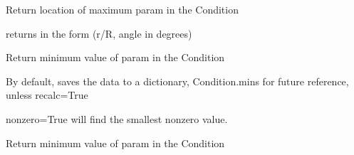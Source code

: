 \documentclass[letterpaper,10pt,english]{sphinxmanual}
\begin{document}
\begin{fulllineitems}
\begin{fulllineitems}
\end{fulllineitems}


\begin{fulllineitems}
\label{\detokenize{api/MARIGOLD.Condition:MARIGOLD.Condition.max_loc}}
\pysigstartsignatures
{}
\pysigstopsignatures
\sphinxAtStartPar
Return location of maximum param in the Condition

\sphinxAtStartPar
returns in the form (r/R, angle in degrees)

\end{fulllineitems}


\begin{fulllineitems}
\label{\detokenize{api/MARIGOLD.Condition:MARIGOLD.Condition.min}}
\pysigstartsignatures
{}
\pysigstopsignatures
\sphinxAtStartPar
Return minimum value of param in the Condition

\sphinxAtStartPar
By default, saves the data to a dictionary, Condition.mins
for future reference, unless recalc=True

\sphinxAtStartPar
nonzero=True will find the smallest nonzero value.

\end{fulllineitems}


\begin{fulllineitems}
\label{\detokenize{api/MARIGOLD.Condition:MARIGOLD.Condition.min_loc}}
\pysigstartsignatures
{}
\pysigstopsignatures
\sphinxAtStartPar
Return minimum value of param in the Condition


\end{fulllineitems}
\end{fulllineitems}
\end{document}
